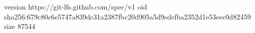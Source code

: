 version https://git-lfs.github.com/spec/v1
oid sha256:679c80c6e5747a839dc31a2387fbc20d905a5d9edefba2352d1e53eec0d82459
size 87544
